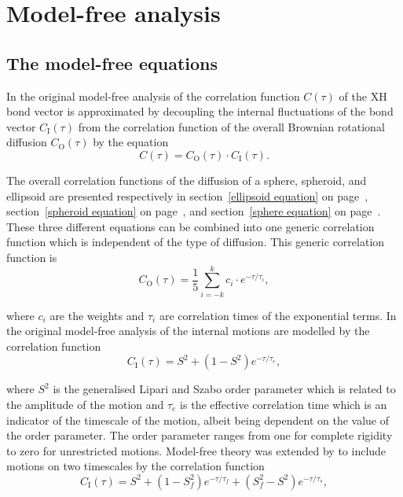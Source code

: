 
\newpage
\section{Model-free analysis}




\subsection{The model-free equations}

In the original model-free analysis of \cite{LipariSzabo82a} the correlation function $C(\tau)$ of the XH bond vector is approximated by decoupling the internal fluctuations of the bond vector $C_\mathrm{I}(\tau)$ from the correlation function of the overall Brownian rotational diffusion $C_\mathrm{O}(\tau)$ by the equation
\begin{equation}
    C(\tau) = C_\mathrm{O}(\tau) \cdot C_\mathrm{I}(\tau).
\end{equation}

\noindent The overall correlation functions of the diffusion of a sphere, spheroid, and ellipsoid are presented respectively in section~\ref{ellipsoid equation} on page~\pageref{ellipsoid equation}, section~\ref{spheroid equation} on page~\pageref{spheroid equation}, and section~\ref{sphere equation} on page~\pageref{sphere equation}.
These three different equations can be combined into one generic correlation function which is independent of the type of diffusion.
This generic correlation function is
\begin{equation}
    C_\mathrm{O}(\tau) = \frac{1}{5} \sum_{i=-k}^k c_i \cdot e^{-\tau/\tau_i},
\end{equation}

\noindent where $c_i$ are the weights and $\tau_i$ are correlation times of the exponential terms.
In the original model-free analysis of \citet{LipariSzabo82a,LipariSzabo82b} the internal motions are modelled by the correlation function
\begin{equation}
    C_\mathrm{I}(\tau) = S^2 + (1 - S^2) e^{-\tau / \tau_e},
\end{equation}

\noindent where $S^2$ is the generalised Lipari and Szabo order parameter which is related to the amplitude of the motion and $\tau_e$ is the effective correlation time which is an indicator of the timescale of the motion, albeit being dependent on the value of the order parameter.
The order parameter ranges from one for complete rigidity to zero for unrestricted motions.
Model-free theory was extended by \citet{Clore90a} to include motions on two timescales by the correlation function
\begin{equation}
    C_\mathrm{I}(\tau) = S^2 + (1 - S^2_f) e^{-\tau / \tau_f} + (S^2_f - S^2) e^{-\tau / \tau_s},
\end{equation}

